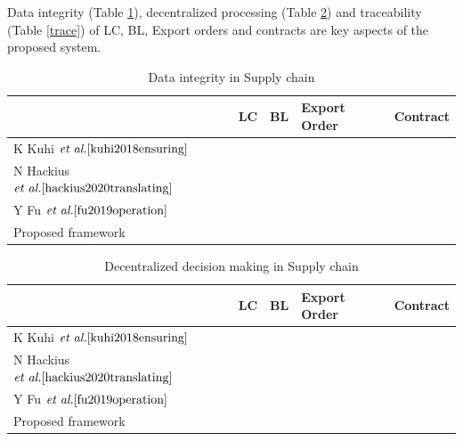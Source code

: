 \documentclass[num-refs]{wiley-article}
\newcommand{\cmark}{\ding{51}}%
\newcommand{\xmark}{\ding{55}}%
\begin{document}
Data integrity (Table \ref{datasec}), decentralized processing (Table \ref{decent}) and traceability (Table \ref{trace}) of LC, BL, Export orders and contracts are key aspects of the proposed system. 


\begin{table}[!h]
\centering
\caption{Data integrity in Supply chain}
\begin{tabular}{|l|l|l|l|l|}
\hline
                                                          & \textbf{LC} & \textbf{BL} & \textbf{Export Order} & \textbf{Contract} \\ \hline
K Kuhi $\textit{et al.} \cite{kuhi2018ensuring}$          &   \xmark        &     \cmark        &               \cmark        &       \cmark            \\ \hline
N Hackius $\textit{et al.} \cite{hackius2020translating}$ &       \cmark      &         \cmark    &        \xmark                &            \cmark       \\ \hline
Y Fu $\textit{et al.} \cite{fu2019operation}$             &        \cmark     &      \xmark        &            \cmark           &         \cmark          \\ \hline
Proposed framework                                        &     \cmark        &     \cmark        &           \cmark            &    \cmark               \\ \hline
\end{tabular}
\label{datasec}
\end{table}


\begin{table}[!h]
\centering
\caption{Decentralized decision making in Supply chain}
\begin{tabular}{|l|l|l|l|l|}
\hline
                                                          & \textbf{LC} & \textbf{BL} & \textbf{Export Order} & \textbf{Contract} \\ \hline
K Kuhi $\textit{et al.} \cite{kuhi2018ensuring}$          &   \xmark        &     \xmark        &               \xmark        &       \cmark            \\ \hline
N Hackius $\textit{et al.} \cite{hackius2020translating}$ &       \xmark      &         \xmark    &        \xmark                &            \cmark       \\ \hline
Y Fu $\textit{et al.} \cite{fu2019operation}$             &        \xmark     &      \xmark        &            \xmark           &         \cmark          \\ \hline
Proposed framework                                        &     \cmark        &     \cmark        &           \cmark            &    \cmark               \\ \hline
\end{tabular}
\label{decent}
\end{table}
\end{document}
